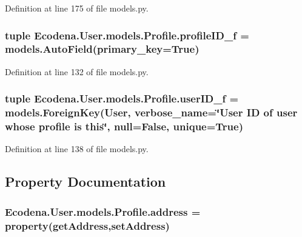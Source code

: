 Definition at line 175 of file models.py.

\hypertarget{class_ecodena_1_1_user_1_1models_1_1_profile_ae4b22732124303ac690d9d6347f8888b}{
\subsubsection[{profileID\_\-f}]{\setlength{\rightskip}{0pt plus 5cm}tuple {\bf Ecodena.User.models.Profile.profileID\_\-f} = models.AutoField(primary\_\-key=True)}}
\label{d2/de8/class_ecodena_1_1_user_1_1models_1_1_profile_ae4b22732124303ac690d9d6347f8888b}


Definition at line 132 of file models.py.

\hypertarget{class_ecodena_1_1_user_1_1models_1_1_profile_a2459a7c3980469d894a491c4aa5e72e1}{
\subsubsection[{userID\_\-f}]{\setlength{\rightskip}{0pt plus 5cm}tuple {\bf Ecodena.User.models.Profile.userID\_\-f} = models.ForeignKey(User, verbose\_\-name=\char`\"{}User ID of user whose profile is this\char`\"{}, null=False, unique=True)}}
\label{d2/de8/class_ecodena_1_1_user_1_1models_1_1_profile_a2459a7c3980469d894a491c4aa5e72e1}


Definition at line 138 of file models.py.



\subsection{Property Documentation}
\hypertarget{class_ecodena_1_1_user_1_1models_1_1_profile_ab63e05e1f2e5890e91ee7843ce356b5f}{
\subsubsection[{address}]{\setlength{\rightskip}{0pt plus 5cm}Ecodena.User.models.Profile.address = property(getAddress,setAddress)}}
\label{d2/de8/class_ecodena_1_1_user_1_1models_1_1_profile_ab63e05e1f2e5890e91ee7843ce356b5f}


